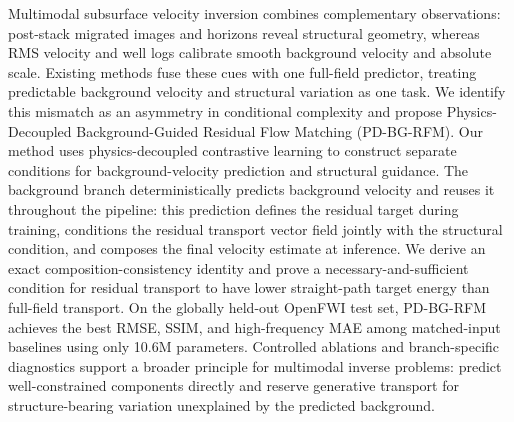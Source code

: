 
Multimodal subsurface velocity inversion combines complementary observations: post-stack migrated images and horizons reveal structural geometry, whereas RMS velocity and well logs calibrate smooth background velocity and absolute scale. Existing methods fuse these cues with one full-field predictor, treating predictable background velocity and structural variation as one task. We identify this mismatch as an asymmetry in conditional complexity and propose Physics-Decoupled Background-Guided Residual Flow Matching (PD-BG-RFM). Our method uses physics-decoupled contrastive learning to construct separate conditions for background-velocity prediction and structural guidance. The background branch deterministically predicts background velocity and reuses it throughout the pipeline: this prediction defines the residual target during training, conditions the residual transport vector field jointly with the structural condition, and composes the final velocity estimate at inference. We derive an exact composition-consistency identity and prove a necessary-and-sufficient condition for residual transport to have lower straight-path target energy than full-field transport. On the globally held-out OpenFWI test set, PD-BG-RFM achieves the best RMSE, SSIM, and high-frequency MAE among matched-input baselines using only 10.6M parameters. Controlled ablations and branch-specific diagnostics support a broader principle for multimodal inverse problems: predict well-constrained components directly and reserve generative transport for structure-bearing variation unexplained by the predicted background.
